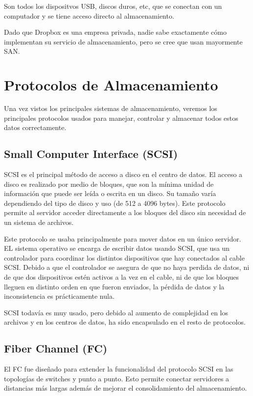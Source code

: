 Son todos los dispositvos USB, discos duros, etc, que se conectan con un computador y se tiene acceso directo al almacenamiento.


Dado que Dropbox es una empresa privada, nadie sabe exactamente cómo implementan su servicio de almacenamiento, pero se cree que usan mayormente SAN.

\section{Protocolos de Almacenamiento}

Una vez vistos los principales sistemas de almacenamiento, veremos los principales protocolos usados para manejar, controlar y almacenar todos estos datos correctamente.

\subsection{Small Computer Interface (SCSI)}

SCSI es el principal método de acceso a disco en el centro de datos. El acceso a disco es realizado por medio de bloques, que son la mínima unidad de información que puede ser leída o escrita en un disco. Su tamaño varía dependiendo del tipo de disco y uso (de 512 a 4096 bytes). Este protocolo permite al servidor acceder directamente a los bloques del disco sin necesidad de un sistema de archivos.

Este protocolo se usaba principalmente para mover datos en un único servidor. EL sistema operativo se encarga de escribir datos usando SCSI, que usa un controlador para coordinar los distintos dispositivos que hay conectados al cable SCSI. Debido a que el controlador se asegura de que no haya perdida de datos, ni de que dos dispositivos estén activos a la vez en el cable, ni de que los bloques lleguen en distinto orden en que fueron enviados, la pérdida de datos y la inconsistencia es prácticamente nula.

SCSI todavía es muy usado, pero debido al aumento de complejidad en los archivos y en los centros de datos, ha sido encapsulado en el resto de protocolos.

\subsection{Fiber Channel (FC)}

El FC fue diseñado para extender la funcionalidad del protocolo SCSI en las topologías de switches y punto a punto. Esto permite conectar servidores a distancias más largas además de mejorar el consolidamiento del almacenamiento.

